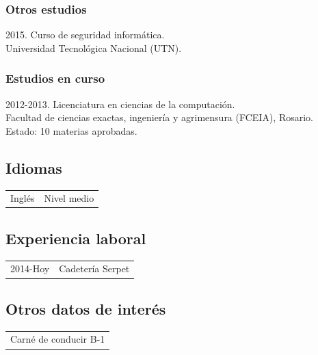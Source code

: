 \documentclass[12pt]{article}
\begin{document}
\subsubsection*{Otros estudios}
\normalsize{2015. Curso de seguridad informática.}\\\small{Universidad Tecnológica Nacional (UTN).}
\subsubsection*{Estudios en curso}
\normalsize{2012-2013. Licenciatura en ciencias de la computación.\\
\small{Facultad de ciencias exactas, ingeniería y agrimensura (FCEIA), Rosario.}\\
Estado: 10 materias aprobadas.}
\subsection*{Idiomas}
\begin{tabular}{l l}
  Inglés&Nivel medio\\
\end{tabular}
\subsection*{Experiencia laboral}
\begin{tabular}{l l}
  2014-Hoy&Cadetería Serpet\\
\end{tabular}
\subsection*{Otros datos de interés}
\begin{tabular}{l}
  Carné de conducir B-1\\
\end{tabular}
\end{document}
